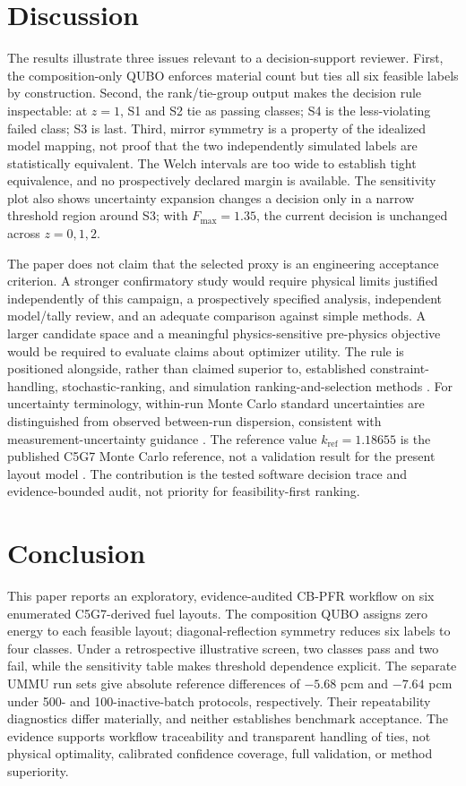 \documentclass[conference]{IEEEtran}
\begin{document}
\section{Discussion}
The results illustrate three issues relevant to a decision-support reviewer. First, the composition-only QUBO enforces material count but ties all six feasible labels by construction. Second, the rank/tie-group output makes the decision rule inspectable: at $z=1$, S1 and S2 tie as passing classes; S4 is the less-violating failed class; S3 is last. Third, mirror symmetry is a property of the idealized model mapping, not proof that the two independently simulated labels are statistically equivalent. The Welch intervals are too wide to establish tight equivalence, and no prospectively declared margin is available. The sensitivity plot also shows uncertainty expansion changes a decision only in a narrow threshold region around S3; with $F_{\max}=1.35$, the current decision is unchanged across $z=0,1,2$.

The paper does not claim that the selected proxy is an engineering acceptance criterion. A stronger confirmatory study would require physical limits justified independently of this campaign, a prospectively specified analysis, independent model/tally review, and an adequate comparison against simple methods. A larger candidate space and a meaningful physics-sensitive pre-physics objective would be required to evaluate claims about optimizer utility. The rule is positioned alongside, rather than claimed superior to, established constraint-handling, stochastic-ranking, and simulation ranking-and-selection methods \cite{deb2000,runarsson2000,kimnelson2006}. For uncertainty terminology, within-run Monte Carlo standard uncertainties are distinguished from observed between-run dispersion, consistent with measurement-uncertainty guidance \cite{taylor1994}. The reference value $k_{\mathrm{ref}}=1.18655$ is the published C5G7 Monte Carlo reference, not a validation result for the present layout model \cite{nea2003,song2020}. The contribution is the tested software decision trace and evidence-bounded audit, not priority for feasibility-first ranking.

\section{Conclusion}
This paper reports an exploratory, evidence-audited CB-PFR workflow on six enumerated C5G7-derived fuel layouts. The composition QUBO assigns zero energy to each feasible layout; diagonal-reflection symmetry reduces six labels to four classes. Under a retrospective illustrative screen, two classes pass and two fail, while the sensitivity table makes threshold dependence explicit. The separate UMMU run sets give absolute reference differences of \(-5.68\) pcm and \(-7.64\) pcm under 500- and 100-inactive-batch protocols, respectively. Their repeatability diagnostics differ materially, and neither establishes benchmark acceptance. The evidence supports workflow traceability and transparent handling of ties, not physical optimality, calibrated confidence coverage, full validation, or method superiority.
\end{document}
